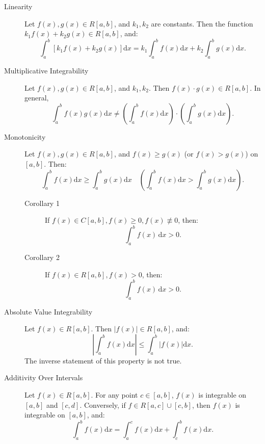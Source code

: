 \documentclass[11pt]{../../TexTemplate/elegantbook}
\begin{document}
\begin{property}
    \begin{description}
        \item [Linearity] Let \( f(x), g(x) \in R[a, b] \), and \( k_1, k_2 \) are constants. 
            Then the function \( k_1 f(x) + k_2 g(x) \in R[a, b] \), and:
            \[
            \int_{a}^b [k_1 f(x) + k_2 g(x)] \mathrm{d}x = k_1 \int_{a}^b f(x) \mathrm{d}x + k_2 \int_{a}^b g(x) \mathrm{d}x.
            \]
        \item[Multiplicative Integrability] Let \( f(x), g(x) \in R[a, b] \), and \( k_1, k_2 \). 
            Then \( f(x) \cdot g(x) \in R[a, b] \). In general, 
            \[
            \int_{a}^b f(x) g(x) \mathrm{d}x \neq \left( \int_{a}^b f(x) \mathrm{d}x \right) \cdot \left( \int_{a}^b g(x) \mathrm{d}x \right).
            \]
        \item[Monotonicity] Let \( f(x), g(x) \in R[a, b] \), 
            and \( f(x) \geqslant g(x) \) (or \( f(x) > g(x) \)) on \( [a, b] \). Then:
            \[
            \int_{a}^b f(x) \mathrm{d}x \geqslant \int_{a}^b g(x) \mathrm{d}x \quad \left( \int_{a}^b f(x) \mathrm{d}x > \int_{a}^b g(x) \mathrm{d}x \right).
            \]
            \begin{description}
                \item[Corollary 1] If \( f(x) \in C[a, b], f(x) \geqslant 0, f(x) \not\equiv 0 \), then:
                    \[
                    \int_{a}^{b} f(x) \, \mathrm{d}x > 0.
                    \]
                \item[Corollary 2] If \( f(x) \in R[a, b], f(x) > 0 \), then:
                    \[
                    \int_{a}^{b} f(x) \, \mathrm{d}x > 0.
                    \]
            \end{description}
        \item[Absolute Value Integrability] Let \( f(x) \in R[a, b] \). Then \( |f(x)| \in R[a, b] \), and:
            \[
            \left| \int_{a}^b f(x) \mathrm{d}x \right| \leqslant \int_{a}^b |f(x)| \mathrm{d}x.
            \]
            The inverse statement of this property is not true.
        \item[Additivity Over Intervals] Let \( f(x) \in R[a, b] \). 
            For any point \( c \in [a, b] \), \( f(x) \) is integrable on \( [a, b] \) and \( [c, d] \). 
            Conversely, if \( f \in R[a, c] \cup [c, b] \), then \( f(x) \) is integrable on \( [a, b] \), and:
            \[
            \int_{a}^b f(x) \mathrm{d}x = \int_{a}^c f(x) \mathrm{d}x + \int_{c}^b f(x) \mathrm{d}x.
            \]
    \end{description}
\end{property}
\end{document}
